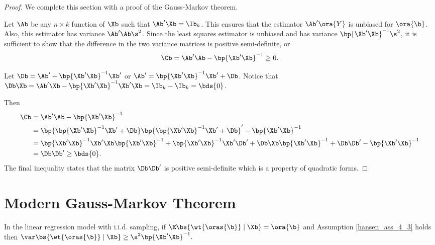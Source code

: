\begin{proof}
    We complete this section with a proof of the Gauss-Markov theorem.

    Let $\Ab$ be any $n \times k$ function of $\Xb$ such that $\Ab^\prime \Xb = \Ib_k$. This ensures that the estimator $\Ab^\prime \ora{Y}$ is unbiased for $\ora{\b}$. Also, this estimator has variance $\Ab^\prime \Ab \s^2$. Since the least squares estimator is unbiased and has variance $\bp{\Xb^\prime \Xb}^{-1} \s^2$, it is sufficient to show that the difference in the two variance matrices is positive semi-definite, or 
    \begin{equation}
        \label{4.11}
        \Cb = \Ab^\prime \Ab - \bp{\Xb^\prime \Xb}^{-1} \geq 0.
    \end{equation}

    Let $\Db = \Ab^\prime - \bp{\Xb^\prime \Xb}^{-1}\Xb^\prime$ or $\Ab^\prime = \bp{\Xb^\prime \Xb}^{-1}\Xb^\prime + \Db$. Notice that $\Db \Xb = \Ab^\prime\Xb - \bp{\Xb^\prime \Xb}^{-1}\Xb^\prime\Xb = \Ib_k - \Ib_k = \bds{0}$.
    
    Then 
    \begin{equation}
        \notag
        \begin{aligned}
            \Cb & = \Ab^\prime \Ab - \bp{\Xb^\prime \Xb}^{-1} \\
            & = \bp{\bp{\Xb^\prime \Xb}^{-1}\Xb^\prime + \Db}\bp{\bp{\Xb^\prime \Xb}^{-1}\Xb^\prime + \Db}^\prime - \bp{\Xb^\prime \Xb}^{-1} \\
            & = \bp{\Xb^\prime \Xb}^{-1}\Xb^\prime\Xb\bp{\Xb^\prime \Xb}^{-1} + \bp{\Xb^\prime \Xb}^{-1}\Xb^\prime \Db^\prime + \Db \Xb \bp{\Xb^\prime \Xb}^{-1} + \Db \Db^\prime - \bp{\Xb^\prime \Xb}^{-1} \\
            & = \Db \Db^\prime \geq \bds{0} .
        \end{aligned}
    \end{equation}
    The final inequality states that the matrix $\Db \Db^\prime$ is positive semi-definite which is a property of quadratic forms.
\end{proof}


\section{Modern Gauss-Markov Theorem}

\begin{theorem}
    \label{hansen_thm_4_5}

    In the linear regression model with i.i.d. sampling, if $\E\bs{\wt{\oras{\b}} \mid \Xb} = \ora{\b}$ and Assumption \ref{hansen_ass_4_3} holds then $\var\bs{\wt{\oras{\b}} \mid \Xb} \geq \s^2 \bp{\Xb^\prime \Xb}^{-1}.$
\end{theorem}

